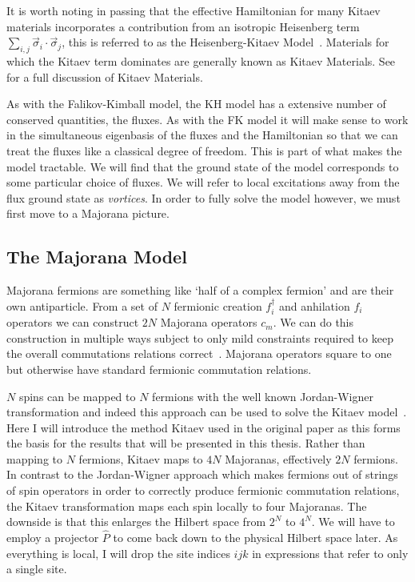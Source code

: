 It is worth noting in passing that the effective Hamiltonian for many Kitaev materials incorporates a contribution from an isotropic Heisenberg term \(\sum_{i,j} \vec{\sigma}_i\cdot\vec{\sigma}_j\), this is referred to as the Heisenberg-Kitaev Model~\autocite{Chaloupka2010}. Materials for which the Kitaev term dominates are generally known as Kitaev Materials. See~\autocite{TrebstPhysRep2022} for a full discussion of Kitaev Materials.

As with the Falikov-Kimball model, the KH model has a extensive number of conserved quantities, the fluxes. As with the FK model it will make sense to work in the simultaneous eigenbasis of the fluxes and the Hamiltonian so that we can treat the fluxes like a classical degree of freedom. This is part of what makes the model tractable. We will find that the ground state of the model corresponds to some particular choice of fluxes. We will refer to local excitations away from the flux ground state as \emph{vortices}. In order to fully solve the model however, we must first move to a Majorana picture.

\hypertarget{the-majorana-model}{%
\subsection{The Majorana Model}\label{the-majorana-model}}

Majorana fermions are something like `half of a complex fermion' and are their own antiparticle. From a set of \(N\) fermionic creation \(f_i^\dagger\) and anhilation \(f_i\) operators we can construct \(2N\) Majorana operators \(c_m\). We can do this construction in multiple ways subject to only mild constraints required to keep the overall commutations relations correct~\autocite{kitaevAnyonsExactlySolved2006}. Majorana operators square to one but otherwise have standard fermionic commutation relations.

\(N\) spins can be mapped to \(N\) fermions with the well known Jordan-Wigner transformation and indeed this approach can be used to solve the Kitaev model~\autocite{chenExactResultsKitaev2008}. Here I will introduce the method Kitaev used in the original paper as this forms the basis for the results that will be presented in this thesis. Rather than mapping to \(N\) fermions, Kitaev maps to \(4N\) Majoranas, effectively \(2N\) fermions. In contrast to the Jordan-Wigner approach which makes fermions out of strings of spin operators in order to correctly produce fermionic commutation relations, the Kitaev transformation maps each spin locally to four Majoranas. The downside is that this enlarges the Hilbert space from \(2^N\) to \(4^N\). We will have to employ a projector \(\hat{P}\) to come back down to the physical Hilbert space later. As everything is local, I will drop the site indices \(ijk\) in expressions that refer to only a single site.

